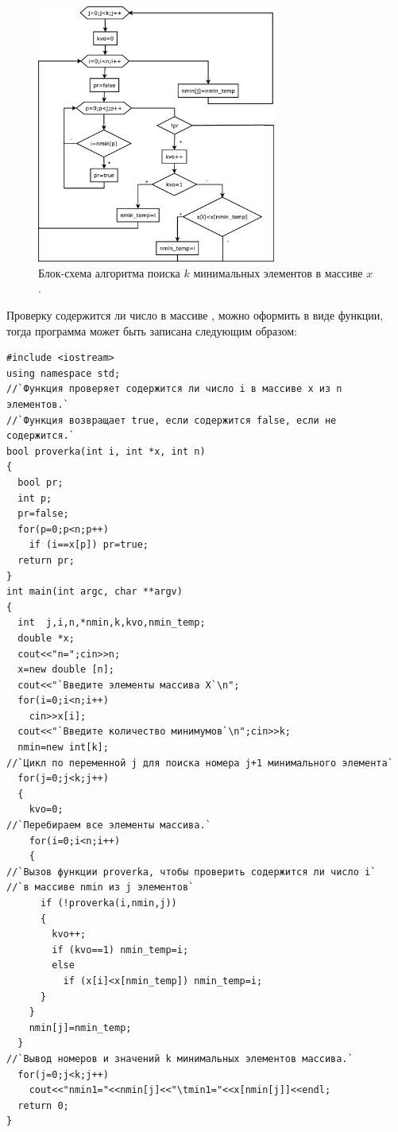 \begin{figure}[htb]
\begin{center}
\includegraphics[width=0.7\textwidth]{img/ris_5_9}
\caption{Блок-схема алгоритма поиска $k$ минимальных элементов в массиве $x$.}
\label{ch05:refDrawing8}
\end{center}
\end{figure}

Проверку содержится ли число  в массиве , можно оформить в виде функции,
тогда программа может быть записана следующим образом:
\begin{lstlisting}
#include <iostream>
using namespace std;
//`Функция проверяет содержится ли число i в массиве x из n элементов.`
//`Функция возвращает true, если содержится false, если не содержится.`
bool proverka(int i, int *x, int n)
{
  bool pr;
  int p;
  pr=false;
  for(p=0;p<n;p++)
    if (i==x[p]) pr=true;
  return pr;
}
int main(int argc, char **argv)
{
  int  j,i,n,*nmin,k,kvo,nmin_temp;
  double *x;
  cout<<"n=";cin>>n;
  x=new double [n];
  cout<<"`Введите элементы массива Х`\n";
  for(i=0;i<n;i++)
    cin>>x[i];
  cout<<"`Введите количество минимумов`\n";cin>>k;
  nmin=new int[k];
//`Цикл по переменной j для поиска номера j+1 минимального элемента`
  for(j=0;j<k;j++)
  {
    kvo=0;
//`Перебираем все элементы массива.`
    for(i=0;i<n;i++)
    {
//`Вызов функции proverka, чтобы проверить содержится ли число i` 
//`в массиве nmin из j элементов`
      if (!proverka(i,nmin,j)) 
      {
        kvo++;
        if (kvo==1) nmin_temp=i;
        else
          if (x[i]<x[nmin_temp]) nmin_temp=i;
      }
    }
    nmin[j]=nmin_temp;		
  }
//`Вывод номеров и значений k минимальных элементов массива.`
  for(j=0;j<k;j++)
    cout<<"nmin1="<<nmin[j]<<"\tmin1="<<x[nmin[j]]<<endl;
  return 0;
}
\end{lstlisting}


